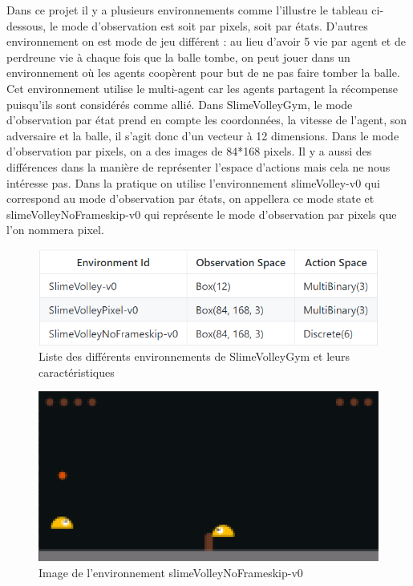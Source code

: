 \documentclass[11pt, a4paper]{article}
\begin{document}
	Dans ce projet il y a plusieurs environnements comme l'illustre le tableau ci-dessous, le mode d'observation est soit par pixels, soit par états. D'autres environnement on est mode de jeu différent : au lieu d'avoir 5 vie par agent et de perdreune vie à chaque fois que la balle tombe, on peut jouer dans un environnement où les agents coopèrent pour but de ne pas faire tomber la balle. Cet environnement utilise le multi-agent car les agents partagent la récompense puisqu'ils sont considérés comme allié.
	Dans SlimeVolleyGym, le mode d'observation par état prend en compte les coordonnées, la vitesse de l'agent, son adversaire et la balle, il s'agit donc d'un vecteur à 12 dimensions. Dans le mode d'observation par pixels, on a des images de 84*168 pixels. Il y a aussi des différences dans la manière de représenter l'espace d'actions mais cela ne nous intéresse pas. Dans la pratique on utilise l'environnement slimeVolley-v0 qui correspond au mode d'observation par états, on appellera ce mode state et slimeVolleyNoFrameskip-v0 qui représente le mode d'observation par pixels que l'on nommera pixel.

	\begin{figure}[H]
		\centering
		\includegraphics[scale=0.8]{images/environnementsS.PNG}
		\caption {Liste des différents environnements de SlimeVolleyGym et leurs caractéristiques \cite{slimevolleygym}}
		\label{tab_env}
	\end{figure}
	\begin{figure}[H]
		\centering
		\includegraphics[scale=0.6]{images/slimeVolleyPixel.PNG}
		\caption {Image de l'environnement slimeVolleyNoFrameskip-v0 \cite{slimevolleygym}}
	\end{figure}
\end{document}
